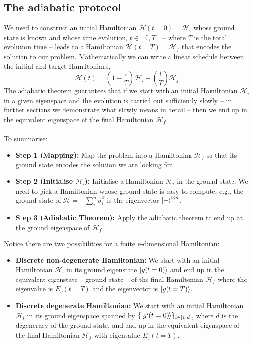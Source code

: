 \subsection{The adiabatic protocol}
We need to construct an initial Hamiltonian $\mathcal{H}(t=0) = \mathcal{H}_{i}$ whose ground state is known and whose time evolution, $t \in \left[0,T\right]$ -- where $T$ is the total evolution time -- leads to a Hamiltonian $\mathcal{H}(t=T) = \mathcal{H}_{f}$ that encodes the solution to our problem. Mathematically we can write a linear schedule between the initial and target Hamiltonians,
\begin{equation}
\label{eq:Htime}
    \mathcal{H}(t) = \left(1-\frac{t}{T}\right)\mathcal{H}_{i} + \left(\frac{t}{T} \right)\mathcal{H}_{f}
\end{equation}
The adiabatic theorem guarantees that if we start with an initial Hamiltonian $\mathcal{H}_{i}$ in a given eigenspace and the evolution is carried out sufficiently slowly -- in further sections we demonstrate what slowly means in detail -- then we end up in the equivalent eigenspace of the final Hamiltonian $\mathcal{H}_{f}$. \\\\
To summarise:
\begin{itemize}
    \item \textbf{Step 1 (Mapping):} Map the problem into a Hamiltonian  $\mathcal{H}_{f}$ so that its ground state encodes the solution we are looking for.
    \item \textbf{Step 2 (Initialise $\mathcal{H}_{i}$):} Initialise a Hamiltonian $\mathcal{H}_{i}$ in the ground state. We need to pick a Hamiltonian whose ground state is easy to compute, e.g., the ground state of $\mathcal{H} = - \sum_{i}^{n}\hat{\sigma}_{i}^{x}$ is the eigenvector $\ket{+}^{\otimes n}$.
    \item \textbf{Step 3 (Adiabatic Theorem):} Apply the adiabatic theorem to end up at the ground eigenspace of $\mathcal{H}_{f}$.
\end{itemize}
Notice there are two possibilities for a finite e-dimensional Hamiltonian:
\begin{itemize}
    \item \textbf{Discrete non-degenerate Hamiltonian:} We start with an initial Hamiltonian $\mathcal{H}_{i}$ in its ground eigenstate $\ket{g(t=0)}$ and end up in the equivalent eigenstate -- ground state -- of the final Hamiltonian $\mathcal{H}_{f}$ where the eigenvalue is $E_{g}(t=T)$ and the eigenvector is $\ket{g(t=T)}$.
    \item \textbf{Discrete degenerate Hamiltonian:} We start with an initial Hamiltonian $\mathcal{H}_{i}$ in its ground eigenspace spanned by $\{\ket{g^{i}(t=0)}\}_{i \in \left[1,d\right]}$, where $d$ is the degeneracy of the ground state, and end up in the equivalent eigenspace of the final Hamiltonian $\mathcal{H}_{f}$ with eigenvalue $E_{g}(t=T)$.
\end{itemize}
